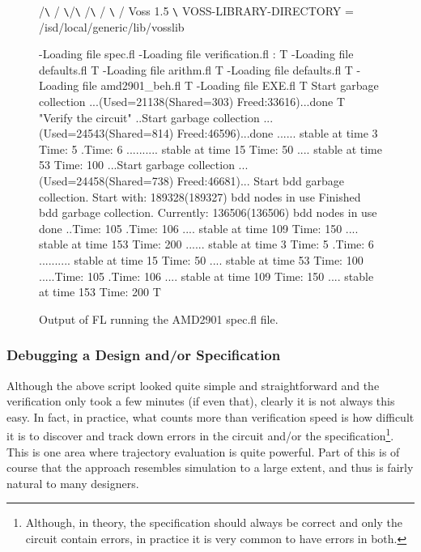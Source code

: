 \begin{figure}[hbtp]
\begin{hol}
      /\verb!\!
     /  \verb!\!/\verb!\!
 /\verb!\! /      \verb!\!
/  Voss 1.5 \verb!\!
VOSS-LIBRARY-DIRECTORY = /isd/local/generic/lib/vosslib

-Loading file spec.fl
-Loading file verification.fl
: T
-Loading file defaults.fl
T
-Loading file arithm.fl
T
-Loading file defaults.fl
T
-Loading file amd2901\_beh.fl
T
-Loading file EXE.fl
T
Start garbage collection ...(Used=21138(Shared=303) Freed:33616)...done
T
"Verify the circuit"
..Start garbage collection ...(Used=24543(Shared=814) Freed:46596)...done
......  stable at time 3
Time: 5
.Time: 6
..........  stable at time 15
Time: 50
....  stable at time 53
Time: 100
...Start garbage collection ...(Used=24458(Shared=738) Freed:46681)...
Start bdd garbage collection.
Start with: 189328(189327) bdd nodes in use
Finished bdd garbage collection.
Currently: 136506(136506) bdd nodes in use
done
..Time: 105
.Time: 106
....  stable at time 109
Time: 150
....  stable at time 153
Time: 200
......  stable at time 3
Time: 5
.Time: 6
..........  stable at time 15
Time: 50
....  stable at time 53
Time: 100
.....Time: 105
.Time: 106
....  stable at time 109
Time: 150
....  stable at time 153
Time: 200
T
\end{hol}
\caption{Output of FL running the AMD2901 spec.fl file.}
\label{FLrun}
\end{figure}

\subsubsection{Debugging a Design and/or Specification}

Although the above script looked quite simple and straightforward
and the verification only took a few minutes (if even that), clearly it
is not always this easy.
In fact, in practice, what counts more than verification speed is
how difficult it is to discover and track down errors in the circuit
and/or the specification\footnote{Although, in theory, the specification
should always be correct and only the circuit contain errors, in practice
it is very common to have errors in both.}.
This is one area where trajectory evaluation is quite powerful.
Part of this is of course that the approach resembles simulation%
%
{} to
a large extent, and thus is fairly natural to many designers.

